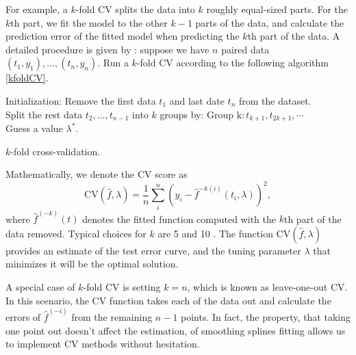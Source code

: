 For example, a $k$-fold CV splits the data into $k$ roughly equal-sized parts. For the $k$th part, we fit the model to the other $k-1$ parts
of the data, and calculate the prediction error of the fitted model when
predicting the $k$th part of the data. A detailed procedure is given by \cite{wahba1975completely}: suppose we have $n$ paired data $(t_1,y_1), \ldots, (t_n,y_n)$. Run a $k$-fold CV according to the following algorithm \ref{kfoldCV}. 
\begin{algorithm}[h]
\SetAlgoLined 
Initialization: Remove the first data $t_1$ and last date $t_n$ from the dataset. \\
Split the rest data $t_2,\ldots,t_{n-1}$ into $k$ groups by: $ \mbox{Group k} : t_{k+1}, t_{2k+1}, \cdots$ \\
Guess a value $\lambda^*$. \\
 \caption{$k$-fold cross-validation.}\label{kfoldCV}
\end{algorithm}
Mathematically, we denote the CV score as 
\begin{equation*}
\mbox{CV}(\hat{f},\lambda) = \frac{1}{n}\sum_i^n \left( y_i -\hat{f}^{-k(i)}(t_i,\lambda) \right)^2,
\end{equation*}
where $\hat{f}^{(-k)}(t)$ denotes the fitted function computed with the $k$th part of the data removed. Typical choices for $k$ are 5 and 10 \cite{esl2009}.  The function $\mbox{CV}(\hat{f},\lambda)$ provides an estimate of the test error curve, and the tuning parameter $\lambda$ that minimizes it will be the optimal solution. 

A special case of $k$-fold CV is setting $k=n$, which is known as leave-one-out CV. In this scenario, the CV function takes each of the data out and calculate the errors of $\hat{f}^{(-i)}$ from the remaining $n-1$ points. In fact, the property, that taking one point out doesn't affect the estimation, of smoothing splines fitting allows us to implement CV methods without hesitation. 


